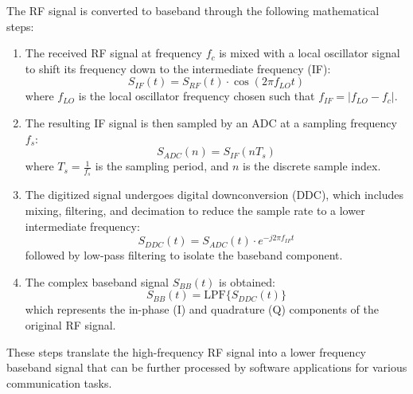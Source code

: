 The RF signal is converted to baseband through the following mathematical steps:

\begin{enumerate}
    \item The received RF signal at frequency \( f_c \) is mixed with a local oscillator signal to shift its frequency down to the intermediate frequency (IF):
    \[ S_{IF}(t) = S_{RF}(t) \cdot \cos(2\pi f_{LO} t) \]
    where \( f_{LO} \) is the local oscillator frequency chosen such that \( f_{IF} = |f_{LO} - f_c| \).

    \item The resulting IF signal is then sampled by an ADC at a sampling frequency \( f_s \):
    \[ S_{ADC}(n) = S_{IF}(nT_s) \]
    where \( T_s = \frac{1}{f_s} \) is the sampling period, and \( n \) is the discrete sample index.

    \item The digitized signal undergoes digital downconversion (DDC), which includes mixing, filtering, and decimation to reduce the sample rate to a lower intermediate frequency:
    \[ S_{DDC}(t) = S_{ADC}(t) \cdot e^{-j2\pi f_{IF} t} \]
    followed by low-pass filtering to isolate the baseband component.

    \item The complex baseband signal \( S_{BB}(t) \) is obtained:
    \[ S_{BB}(t) = \text{LPF}\{S_{DDC}(t)\} \]
    which represents the in-phase (I) and quadrature (Q) components of the original RF signal.
\end{enumerate}
These steps translate the high-frequency RF signal into a lower frequency baseband signal that can be further processed by software applications for various communication tasks.